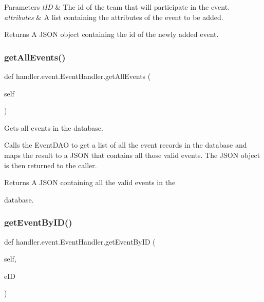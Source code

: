 \begin{DoxyParams}{Parameters}
{\em t\+ID} & The id of the team that will participate in the event. \\
\hline
{\em attributes} & A list containing the attributes of the event to be added. \\
\hline
\end{DoxyParams}
\begin{DoxyReturn}{Returns}
A J\+S\+ON object containing the id of the newly added event. 
\end{DoxyReturn}
\mbox{\label{classhandler_1_1event_1_1_event_handler_a5ea11d438c3a6c39524dcde68f87a6c2}} 
\subsubsection{\texorpdfstring{get\+All\+Events()}{getAllEvents()}}
{\footnotesize\ttfamily def handler.\+event.\+Event\+Handler.\+get\+All\+Events (\begin{DoxyParamCaption}\item[{}]{self }\end{DoxyParamCaption})}



Gets all events in the database. 

Calls the Event\+D\+AO to get a list of all the event records in the database and maps the result to a J\+S\+ON that contains all those valid events. The J\+S\+ON object is then returned to the caller.

\begin{DoxyReturn}{Returns}
A J\+S\+ON containing all the valid events in the 

database. 
\end{DoxyReturn}
\mbox{\label{classhandler_1_1event_1_1_event_handler_ab5e4836ec9f0aea002d0be3f7227566e}} 
\subsubsection{\texorpdfstring{get\+Event\+By\+I\+D()}{getEventByID()}}
{\footnotesize\ttfamily def handler.\+event.\+Event\+Handler.\+get\+Event\+By\+ID (\begin{DoxyParamCaption}\item[{}]{self,  }\item[{}]{e\+ID }\end{DoxyParamCaption})}



